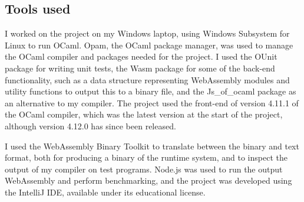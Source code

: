 

\subsection{Tools used} %
I worked on the project on my Windows laptop, using Windows Subsystem for Linux to run OCaml. Opam, the OCaml package manager, was used to manage the 
OCaml compiler and packages needed for the project. I used the OUnit package for writing unit tests, the Wasm package for some of the back-end functionality, such as a data structure representing WebAssembly modules and utility functions to output this to a binary file, and the Js\_of\_ocaml package as an alternative to my compiler. The project used the front-end of version 4.11.1 of the OCaml compiler, which was the latest version at the start of the project, although version 4.12.0 has since been released. 


I used the WebAssembly Binary Toolkit to translate between the binary and text format, both for producing a binary of the runtime system, and to inspect the output of my compiler on test programs. Node.js was used to run the output WebAssembly and perform benchmarking, and the project was developed using the IntelliJ IDE, available under its educational license.


